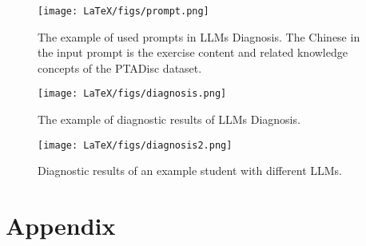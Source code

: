 \clearpage
\begin{figure*}[!htb]
  \centering
  \texttt{[image: LaTeX/figs/prompt.png]}
  \caption{The example of used prompts in LLMs Diagnosis. The Chinese in the input prompt is the exercise content and related knowledge concepts of the PTADisc dataset.}
\label{fig: prompt}
\end{figure*}

\begin{figure*}[!htb]
  \centering
  \texttt{[image: LaTeX/figs/diagnosis.png]}
  \caption{The example of diagnostic results of LLMs Diagnosis.}
\label{fig: diagnosis}
\end{figure*}

\begin{figure*}[!htb]
  \centering
  \texttt{[image: LaTeX/figs/diagnosis2.png]}
  \caption{Diagnostic results of an example student with different LLMs.}
\label{fig: diagnosis2}
\end{figure*}

\appendix



\section{Appendix}



